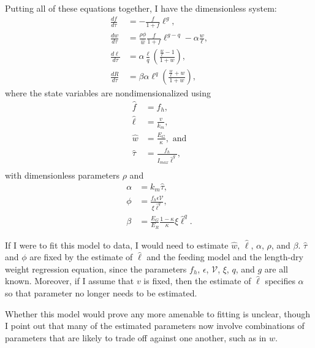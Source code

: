\documentclass[12pt,reqno,final,pdftex]{amsart}\usepackage[]{graphicx}\usepackage[]{color}
\theoremstyle{plain}
\numberwithin{equation}{part}
\begin{document}
Putting all of these equations together, I have the dimensionless system:
\begin{align}
\frac{df}{d\tau} &= -\frac{f}{1+f}\ell^g, \\
\frac{dw}{d\tau} &= \frac{\rho\phi}{\hat{w}}\frac{f}{1+f}\ell^{g-q}-\alpha\frac{w}{\ell}, \\
\frac{d\ell}{d\tau} &= \alpha \frac{\ell}{q}\left(\frac{\frac{w}{\ell}-1}{1+w}\right), \\
\frac{dR}{d\tau} &= \beta \alpha \ell^q \left(\frac{\frac{w}{\ell}+w}{1+w}\right),
\end{align}
where the state variables are nondimensionalized using
\begin{align}
\hat{f} &= f_h, \\
\hat{\ell} &= \frac{v}{k_m}, \\
\hat{w} &= \frac{E_G}{\kappa}, \text{ and}\\
\hat{\tau} &= \frac{f_h}{I_{max} \hat{\ell}^g}, \\
\end{align}
with dimensionless parameters $\rho$ and
\begin{align}
\alpha &= k_m \hat{\tau}, \\
\phi &= \frac{f_h \epsilon \mathcal{V}}{\xi \hat{\ell}^q}, \\
\beta &= \frac{E_G}{E_R}\frac{1-\kappa}{\kappa}\xi\hat{\ell}^q.
\end{align}

If I were to fit this model to data, I would need to estimate $\hat{w}$, $\hat{\ell}$, $\alpha$, $\rho$, and $\beta$.
$\hat{\tau}$ and $\phi$ are fixed by the estimate of $\hat{\ell}$ and the feeding model and the length-dry weight regression equation, since the parameters $f_h$, $\epsilon$, $\mathcal{V}$, $\xi$, $q$, and $g$ are all known.
Moreover, if I assume that $v$ is fixed, then the estimate of $\hat{\ell}$ specifies $\alpha$ so that parameter no longer needs to be estimated.

Whether this model would prove any more amenable to fitting is unclear, though I point out that many of the estimated parameters now involve combinations of parameters that are likely to trade off against one another, such as in $\hat{w}$.
\end{document}
